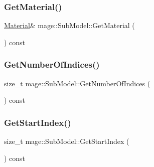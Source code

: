 \hypertarget{classmage_1_1_sub_model_af993f41f73a72df9fca154083c5f7410}{}\label{classmage_1_1_sub_model_af993f41f73a72df9fca154083c5f7410} 
\subsubsection{\texorpdfstring{Get\+Material()}{GetMaterial()}}
{\footnotesize\ttfamily \hyperlink{structmage_1_1_material}{Material}\& mage\+::\+Sub\+Model\+::\+Get\+Material (\begin{DoxyParamCaption}{ }\end{DoxyParamCaption}) const}

\hypertarget{classmage_1_1_sub_model_a18736678fc1a5d882776298053e037b3}{}\label{classmage_1_1_sub_model_a18736678fc1a5d882776298053e037b3} 
\subsubsection{\texorpdfstring{Get\+Number\+Of\+Indices()}{GetNumberOfIndices()}}
{\footnotesize\ttfamily size\+\_\+t mage\+::\+Sub\+Model\+::\+Get\+Number\+Of\+Indices (\begin{DoxyParamCaption}{ }\end{DoxyParamCaption}) const}

\hypertarget{classmage_1_1_sub_model_a2b901cb62dca26a7ff399719e0a4ba66}{}\label{classmage_1_1_sub_model_a2b901cb62dca26a7ff399719e0a4ba66} 
\subsubsection{\texorpdfstring{Get\+Start\+Index()}{GetStartIndex()}}
{\footnotesize\ttfamily size\+\_\+t mage\+::\+Sub\+Model\+::\+Get\+Start\+Index (\begin{DoxyParamCaption}{ }\end{DoxyParamCaption}) const}

\hypertarget{classmage_1_1_sub_model_aafc8b4ba509ec78ea36719e98b1a0c99}{}\label{classmage_1_1_sub_model_aafc8b4ba509ec78ea36719e98b1a0c99} 

